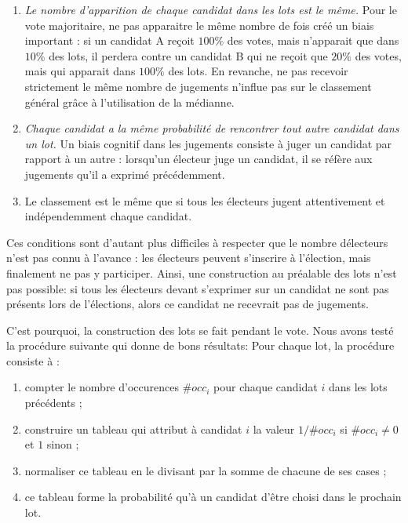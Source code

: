 \documentclass[conference]{IEEEtran}
\begin{document}
\begin{enumerate}
  \item \emph{Le nombre d'apparition de chaque candidat dans les lots est le m\^eme.} Pour le vote majoritaire, ne pas apparaitre le m\^eme nombre de fois cr\'e\'e un biais important : si un candidat A re\c{c}oit $100\%$ des votes, mais n'apparait que dans $10\%$ des lots, il perdera contre un candidat B qui ne re\c{c}oit que $20\%$ des votes, mais qui apparait dans $100\%$ des lots. En revanche, ne pas recevoir strictement le m\^eme nombre de jugements n'influe pas sur le classement g\'en\'eral gr\^ace \`a l'utilisation de la m\'edianne.
  \item \emph{Chaque candidat a la m\^eme probabilit\'e de rencontrer tout autre candidat dans un lot.} Un biais cognitif dans les jugements consiste \`a juger un candidat par rapport \`a un autre : lorsqu'un \'electeur juge un candidat, il se r\'ef\`ere aux jugements qu'il a exprim\'e pr\'ec\'edemment. 
  \item Le classement est le m\^eme que si tous les \'electeurs jugent attentivement et ind\'ependemment chaque candidat. 
\end{enumerate}

Ces conditions sont d'autant plus difficiles \`a respecter que le nombre d\'electeurs n'est pas connu \`a l'avance : les \'electeurs peuvent s'inscrire \`a l'\'election, mais finalement ne pas y participer. Ainsi, une construction au pr\'ealable des lots n'est pas possible: si tous les \'electeurs devant s'exprimer sur un candidat ne sont pas pr\'esents lors de l'\'elections, alors ce candidat ne recevrait pas de jugements.


C'est pourquoi, la construction des lots se fait pendant le vote. Nous avons test\'e la proc\'edure suivante qui donne de bons r\'esultats:
Pour chaque lot, la proc\'edure consiste \`a :
\begin{enumerate}
  \item compter le nombre d'occurences $\#occ_i$ pour chaque candidat $i$ dans les lots pr\'ec\'edents ;
  \item construire un tableau qui attribut \`a candidat $i$ la valeur $1/\#occ_i$ si $\#occ_i \ne 0$ et $1$ sinon ;
  \item normaliser ce tableau en le divisant par la somme de chacune de ses cases ;
  \item ce tableau forme la probabilit\'e qu'\`a un candidat d'\^etre choisi dans le prochain lot.
\end{enumerate}
\end{document}
